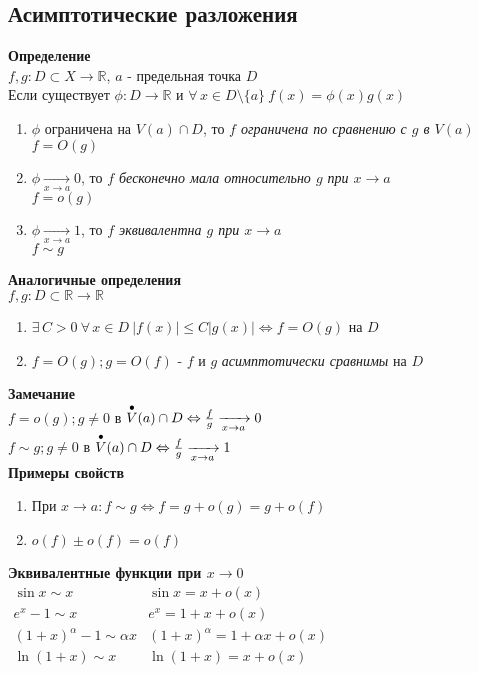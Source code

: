 \documentclass[12pt]{article}
\begin{document}
\subsection{Асимптотические разложения}
\textbf{Определение}\\
$f,g:D\subset X \rightarrow \mathbb{R}$, $a$ - предельная точка $D$\\
Если существует $\phi: D \rightarrow \mathbb{R}$ и $\forall\,x\in D\setminus\{a\}\ f(x) = \phi(x)g(x)$
\begin{enumerate}
    \item $\phi$ ограничена на $V(a) \cap D$, то \textit{$f$ ограничена по сравнению с $g$ в $V(a)$}\\
    $f = O(g)$
    \item $\phi\xrightarrow[x\rightarrow a]{} 0$, то \textit{$f$ бесконечно мала относительно $g$ при $x\rightarrow a$}\\
    $f = o(g)$ 
    \item $\phi\xrightarrow[x\rightarrow a]{} 1$, то \textit{$f$ эквивалентна $g$ при $x\rightarrow a$}\\
    $f \sim g$
\end{enumerate}
\textbf{Аналогичные определения}\\
$f,g:D\subset \mathbb{R} \rightarrow \mathbb{R}$
\begin{enumerate}
    \item $\exists\,C > 0\ \forall\,x\in D\ |f(x)| \leq C|g(x)| \Leftrightarrow f=O(g)$ на $D$
    \item $f=O(g); g=O(f)$ - $f$ и $g$ \textit{асимптотически сравнимы} на $D$
\end{enumerate}
\textbf{Замечание}\\
$f=o(g); g \neq 0$ в $\overset{\bullet} V(a) \cap D \Leftrightarrow \frac fg \xrightarrow[x\rightarrow a]{}0$\\
$f \sim g; g \neq 0$ в $\overset{\bullet} V(a) \cap D \Leftrightarrow \frac fg \xrightarrow[x\rightarrow a]{}1$\\
\textbf{Примеры свойств}
\begin{enumerate}
    \item При $x \rightarrow a: f \sim g \Leftrightarrow f = g+o(g) = g+o(f)$
    \item $o(f) \pm o(f) = o(f)$
\end{enumerate}
\textbf{Эквивалентные функции при $x \rightarrow 0$}\\
$\begin{array}{ll}
    \sin x \sim x & \sin x = x + o(x)\\
    e^x -1 \sim x & e^x = 1 + x + o(x)\\
    (1+x)^\alpha - 1 \sim \alpha x & (1+x)^\alpha = 1 + \alpha x + o(x)\\
    \ln(1+x) \sim x & \ln(1+x) = x + o(x)\\
\end{array}$\\\\
\end{document}
